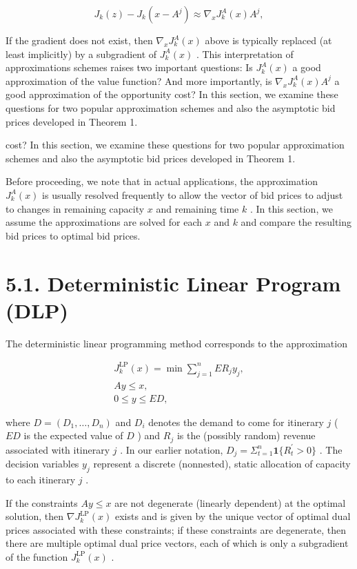 \[
J_{k}(z) - J_{k}(x - A^{j})\approx \nabla_{x}J_{k}^{A}(x)A^{j},
\]

If the gradient does not exist, then \(\nabla_{x}J_{k}^{A}(x)\) above is
typically replaced (at least implicitly) by a subgradient of
\(J_{k}^{A}(x)\) . This interpretation of approximations schemes raises
two important questions: Is \(J_{k}^{A}(x)\) a good approximation of the
value function? And more importantly, is \(\nabla_{x}J_{k}^{A}(x)A^{j}\)
a good approximation of the opportunity cost? In this section, we
examine these questions for two popular approximation schemes and also
the asymptotic bid prices developed in Theorem 1.

cost? In this section, we examine these questions for two popular
approximation schemes and also the asymptotic bid prices developed in
Theorem 1.

Before proceeding, we note that in actual applications, the
approximation \(J_{k}^{A}(x)\) is usually resolved frequently to allow
the vector of bid prices to adjust to changes in remaining capacity
\(x\) and remaining time \(k\) . In this section, we assume the
approximations are solved for each \(x\) and \(k\) and compare the
resulting bid prices to optimal bid prices.

\section{5.1. Deterministic Linear Program
(DLP)}\label{deterministic-linear-program-dlp}

The deterministic linear programming method corresponds to the
approximation

\[
\begin{array}{c}{{J_{k}^{\mathrm{LP}}(x)=\min \sum_{j=1}^{n}E R_{j}y_{j},}}\\ {{A y\leq x,}}\\ {{0\leq y\leq E D,}}\end{array}
\]

where \(D = (D_{1},\ldots ,D_{n})\) and \(D_{i}\) denotes the demand to
come for itinerary \(j\) ( \(ED\) is the expected value of \(D\) ) and
\(R_{j}\) is the (possibly random) revenue associated with itinerary
\(j\) . In our earlier notation,
\(D_{j} = \Sigma_{t = 1}^{n} \mathbf{1}\{R_{t}^{\prime} > 0\}\) . The
decision variables \(y_{j}\) represent a discrete (nonnested), static
allocation of capacity to each itinerary \(j\) .

If the constraints \(A y\leq x\) are not degenerate (linearly dependent)
at the optimal solution, then \(\nabla J_{k}^{\mathrm{LP}}(x)\) exists
and is given by the unique vector of optimal dual prices associated with
these constraints; if these constraints are degenerate, then there are
multiple optimal dual price vectors, each of which is only a subgradient
of the function \(J_{k}^{\mathrm{LP}}(x)\) .

